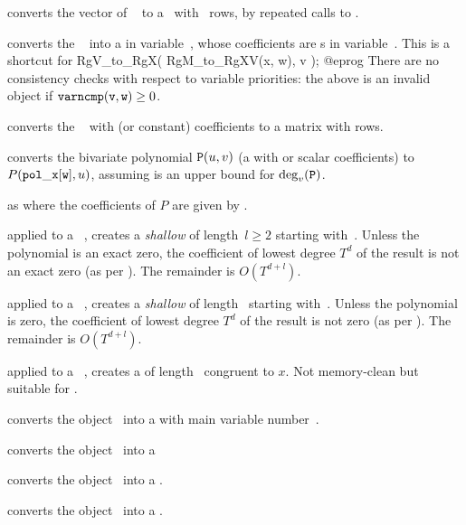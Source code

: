  converts the vector of ~
to a~ with ~rows, by repeated calls to .

 converts the ~ into
a  in variable~, whose coefficients are s in
variable~. This is a shortcut for
\bprog
  RgV_to_RgX( RgM_to_RgXV(x, w), v );
@eprog\noindent
There are no consistency checks with respect to variable
priorities: the above is an invalid object if ${\tt varncmp(v, w)} \geq 0$.

 converts the ~ with
 (or constant) coefficients to a matrix with  rows.

 converts the bivariate polynomial
${\tt P}(u,v)$ (a  with  or scalar coefficients) to
$P({\tt pol\_x[w]},u)$, assuming  is an upper bound for
$\deg_v({\tt P})$.

as  where the coefficients of $P$ are given by
.

 applied to a ~, creates
a \emph{shallow}  of length~$l\geq 2$ starting with~.
Unless the polynomial is an exact zero, the coefficient of lowest degree
$T^d$ of the result is not an exact zero (as per ). The
remainder is $O(T^{d+l})$.

 applied to a ~,
creates a \emph{shallow}  of length~ starting with~.
Unless the polynomial is zero, the coefficient of lowest degree
$T^d$ of the result is not zero (as per ). The
remainder is $O(T^{d+l})$.

 applied to a ~,
creates a  of length~ congruent to $x$. Not memory-clean
but suitable for .

 converts the object~ into a 
with main variable number~.

 converts the object~ into a 

 converts the object~ into a .

 converts the object~ into a .

